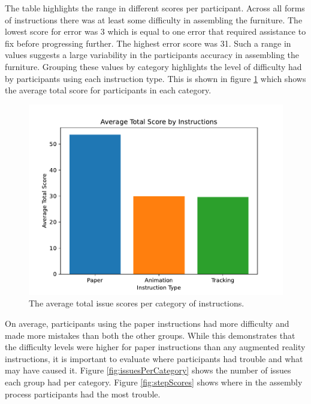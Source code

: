\documentclass{l4proj}
\begin{document}
The table highlights the range in different scores per participant. Across all forms of instructions there was at least some difficulty in assembling the furniture. The lowest score for error was 3 which is equal to one error that required assistance to fix before progressing further. The highest error score was 31. Such a range in values suggests a large variability in the participants accuracy in assembling the furniture. Grouping these values by category highlights the level of difficulty had by participants using each instruction type. This is shown in figure \ref{fig:avgScores} which shows the average total score for participants in each category. \clearpage

\begin{figure}[hbt!]
    \centering
    \includegraphics[width=0.75\linewidth]{dissertation//images/avgScores.pdf}
    \caption{The average total issue scores per category of instructions.}
    \label{fig:avgScores}
\end{figure}

On average, participants using the paper instructions had more difficulty and made more mistakes than both the other groups. While this demonstrates that the difficulty levels were higher for paper instructions than any augmented reality instructions, it is important to evaluate where participants had trouble and what may have caused it. Figure \ref{fig:issuesPerCategory} shows the number of issues each group had per category. Figure \ref{fig:stepScores} shows where in the assembly process participants had the most trouble.

\end{document}
